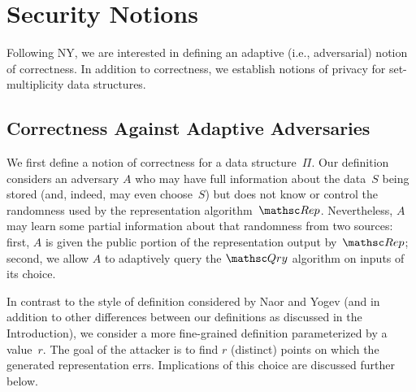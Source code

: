 
\section{Security Notions}
\label{sec:security-notions}
Following NY, we are interested in defining an adaptive (i.e.,
adversarial) notion of correctness.
In addition to correctness, we establish notions of privacy for
set-multiplicity data structures.



 


\subsection{Correctness Against Adaptive Adversaries}

We first define a notion of correctness for a data structure~$\Pi$. Our definition
considers an adversary $A$ who may have full information about the data~$S$ being stored (and, indeed,
may even choose~$S$) but does not know or control the randomness used by the representation
algorithm~$\Rep$. Nevertheless, $A$ may learn some partial information about that randomness from
two sources: first, $A$ is given the public portion of the representation output
by~$\Rep$; second, we allow $A$ to adaptively query the $\Qry$ algorithm on inputs
of its choice.

In contrast to the style of definition considered by Naor and Yogev (and in addition
to other differences between our definitions as discussed in the Introduction), we consider
a more fine-grained definition parameterized by a value~$r$. The goal of the attacker
is to find $r$ (distinct) points on which the generated representation errs.
Implications of this choice are discussed further below.

